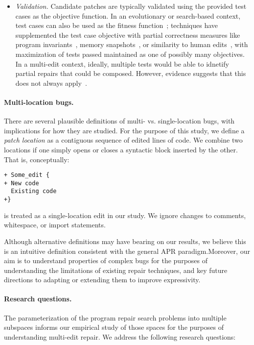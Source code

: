 \documentclass[sigconf, timestamp-false, anonymous=true]{acmart}
\begin{document}
\begin{itemize}
\item \emph{Validation.} Candidate patches are typically validated using the
  provided test cases as the objective function.  In an evolutionary or
  search-based context, test cases can also be used as the fitness
  function~\cite{genprog}; techniques have supplemented the test
  case objective with partial correctness measures like program
  invariants~\cite{dinglyu}, memory snapshots~\cite{source-code-checkpoint}, or
  similarity to human edits~\cite{hdrepair}, with maximization of tests passed
  maintained as one of possibly many objectives.  In a multi-edit context,
  ideally, multiple tests would be able to idnetify partial repairs that could
  be composed.  However, evidence suggests that this does not always
  apply~\cite{better-fitness,schulte}. 
\end{itemize}



\paragraph{Multi-location bugs.} There are several plausible definitions of multi- vs. single-location bugs, with
implications for how they are studied. For the purpose of this study, we define
a \emph{patch location} as a contiguous sequence of edited lines of
code.  We combine two locations if one simply opens or closes a syntactic block
inserted by the other. That is, conceptually:
\begin{lstlisting}
+ Some_edit {
+ New code
  Existing code 
+}
\end{lstlisting}
is treated as a single-location edit in our study.  We ignore changes to
comments, whitespace, or import statements. 

Although alternative definitions may have bearing on our results, we believe this is an intuitive definition consistent with the general APR paradigm.Moreover, our aim is to understand properties of 
complex bugs for the purposes of understanding the limitations of
existing repair techniques, and key future directions to
adapting or extending them to improve expressivity. 

\paragraph{Research questions.}  The parameterization of the program repair
search problems into multiple subspaces informs our empirical study of those
spaces for the purposes of understanding multi-edit repair.  We address the
following research questions:
\end{document}
